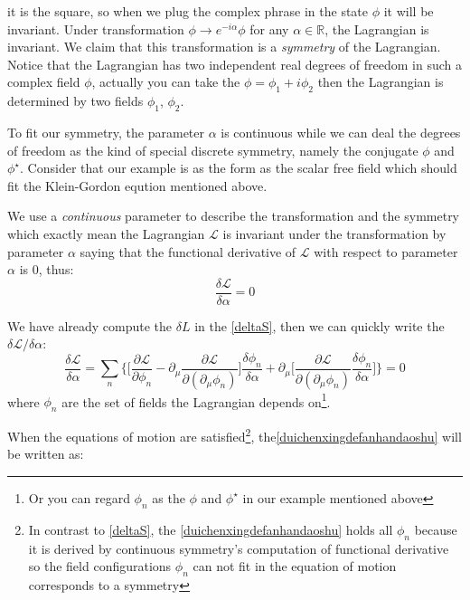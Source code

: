 \documentclass[12pt,openany]{book}
\begin{document}
	it is the square, so when we plug the complex phrase in the state $\phi$ it will be invariant. Under transformation $\phi\rightarrow e^{-i\alpha}\phi$ for any 
	$\alpha\in\mathbb{R}$, the Lagrangian is invariant. We claim that this transformation is a \textit{symmetry} of the Lagrangian. Notice that 
	the Lagrangian has two  independent real degrees of freedom in such a complex field $\phi$, actually you can take the $\phi=\phi_1+i\phi_2$ then the Lagrangian is 
	determined by two fields $\phi_1$, $\phi_2$. \par 
	To fit our symmetry, the parameter $\alpha$ is continuous while we can deal the 
	degrees of freedom as the kind of special discrete symmetry, namely the conjugate $\phi$ and $\phi^\star$. Consider that our example is 
	as the form as the scalar free field which should fit the Klein-Gordon eqution mentioned above.\par 
	We use a \textit{continuous} parameter to describe the transformation and the symmetry which  exactly mean the Lagrangian $\mathcal{L}$ is 
	invariant under the transformation by parameter $\alpha$ saying that the functional derivative of $\mathcal{L}$ with respect to parameter $\alpha$ is $0$, thus:
	\begin{equation}
		\frac{\delta\mathcal{L}}{\delta\alpha}=0
	\end{equation}\par 
	We have already compute the $\delta L$ in the \eqref{deltaS}, then we can quickly write the $\delta\mathcal{L}/\delta\alpha$:
	\begin{equation}\label{duichenxingdefanhandaoshu}
		\frac{\delta\mathcal{L}}{\delta\alpha}= \sum_{n}\big\{\big[\frac{\partial\mathcal{L}}{\partial\phi_n}-\partial_\mu\frac{\partial\mathcal{L}}{\partial(\partial_\mu\phi_n)}\big]\frac{\delta\phi_n}{\delta\alpha}+\partial_\mu\big[\frac{\partial\mathcal{L}}{\partial(\partial_\mu\phi_n)}\frac{\delta\phi_n}{\delta\alpha}\big] \big\}=0
	\end{equation}
	where $\phi_n$ are the set of fields the Lagrangian depends on\footnote{Or you can regard $\phi_n$ as the $\phi$ and $\phi^\star$ in our example mentioned above}. \par 
	When the equations of motion are satisfied\footnote{In contrast to \eqref{deltaS}, the \eqref{duichenxingdefanhandaoshu} holds all $\phi_n$ because it is 
		derived by continuous symmetry's computation of functional derivative so the field configurations $\phi_n$ can not fit in the equation of motion corresponds to a symmetry}, the\eqref{duichenxingdefanhandaoshu} will be written as:
\end{document}
